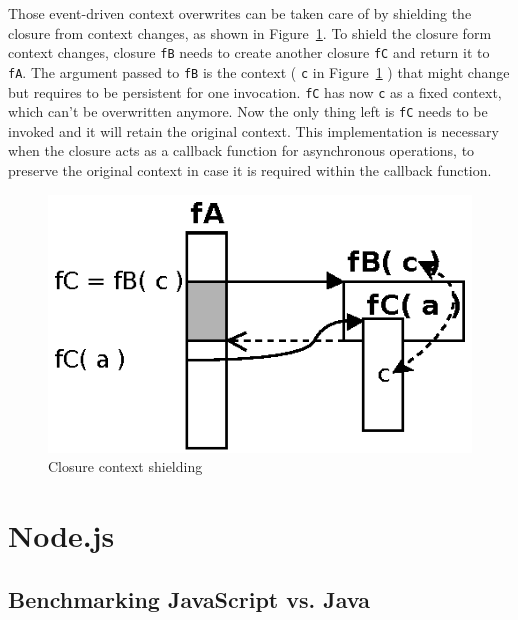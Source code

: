 Those event-driven context overwrites can be taken care of by shielding the closure from context changes, as shown in Figure~\ref{fig:Closures_Closure-3}.
To shield the closure form context changes, closure \texttt{fB} needs to create another closure \texttt{fC} and return it to \texttt{fA}.
The argument passed to \texttt{fB} is the context ( \texttt{c} in Figure~\ref{fig:Closures_Closure-3} ) that might change but requires to be persistent for one invocation.
\texttt{fC} has now \texttt{c} as a fixed context, which can't be overwritten anymore.
Now the only thing left is \texttt{fC} needs to be invoked and it will retain the original context.
This implementation is necessary when the closure acts as a callback function for asynchronous operations, to preserve the original context in case it is required within the callback function.
\begin{figure}[!ht]
	\centering
  \includegraphics{figures/Closures_Closure-3}
	\caption{Closure context shielding}
	\label{fig:Closures_Closure-3}
\end{figure}



\section{Node.js}

\subsection{Benchmarking JavaScript vs. Java}

